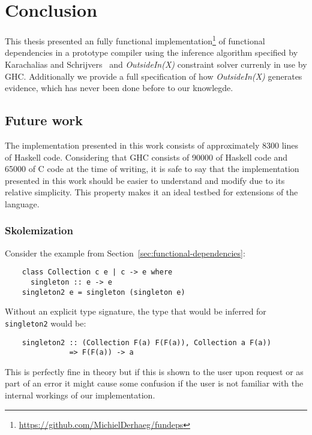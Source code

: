 \chapter{Conclusion}
\label{cha:conclusion}

This thesis presented an fully functional
implementation\footnote{\url{https://github.com/MichielDerhaeg/fundeps}} of
functional dependencies in a prototype compiler using the inference algorithm
specified by Karachalias and
Schrijvers~\cite{Karachalias:2017:EFD:3156695.3122966} and
\textit{OutsideIn(X)}\cite{outsideinx-modular-type-inference-with-local-assumptions}
constraint solver currenly in use by GHC. Additionally we provide a full
specification of how \textit{OutsideIn(X)} generates evidence, which has never
been done before to our knowlegde.

\section{Future work}

The implementation presented in this work consists of approximately 8300 lines
of Haskell code. Considering that GHC consists of 90000 of Haskell code and
65000 of C code at the time of writing, it is safe to say that the
implementation presented in this work should be easier to understand and modify
due to its relative simplicity. This property makes it an ideal testbed for
extensions of the language.

\subsection{Skolemization}

Consider the example from Section~\ref{sec:functional-dependencies}:
\begin{verbatim}
    class Collection c e | c -> e where
      singleton :: e -> e
    singleton2 e = singleton (singleton e)
\end{verbatim}

Without an explicit type signature, the type that would be inferred for
\texttt{singleton2} would be:

\begin{verbatim}
    singleton2 :: (Collection F(a) F(F(a)), Collection a F(a))
               => F(F(a)) -> a
\end{verbatim}

This is perfectly fine in theory but if this is shown to the user upon request
or as part of an error it might cause some confusion if the user is not familiar
with the internal workings of our implementation.

